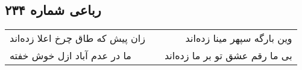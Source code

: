 \begin{center}
\section*{رباعی شماره ۲۳۴}
\label{sec:sh234}
\begin{longtable}{l p{0.5cm} r}
زان پیش که طاق چرخ اعلا زده‌اند
&&
وین بارگه سپهر مینا زده‌اند
\\
ما در عدم آباد ازل خوش خفته
&&
بی ما رقم عشق تو بر ما زده‌اند
\\
\end{longtable}
\end{center}
